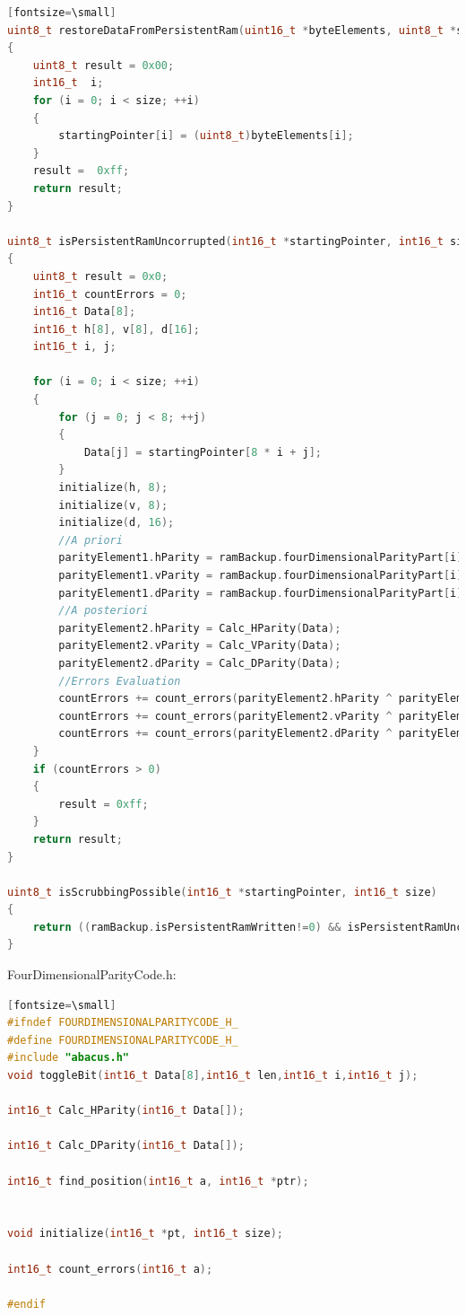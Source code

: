 \documentclass[LaM,binding=0.6cm]{../sapthesis}
\begin{document}
\begin{lstlisting}[language=c][fontsize=\small]
uint8_t restoreDataFromPersistentRam(uint16_t *byteElements, uint8_t *startingPointer, uint32_t size)
{
    uint8_t result = 0x00;
    int16_t  i;
    for (i = 0; i < size; ++i)
    {
        startingPointer[i] = (uint8_t)byteElements[i];
    }
    result =  0xff;
    return result;
}

uint8_t isPersistentRamUncorrupted(int16_t *startingPointer, int16_t size)
{
    uint8_t result = 0x0;
    int16_t countErrors = 0;
    int16_t Data[8];
    int16_t h[8], v[8], d[16];
    int16_t i, j;

    for (i = 0; i < size; ++i)
    {
        for (j = 0; j < 8; ++j)
        {
            Data[j] = startingPointer[8 * i + j];
        }
        initialize(h, 8);
        initialize(v, 8);
        initialize(d, 16);
        //A priori
        parityElement1.hParity = ramBackup.fourDimensionalParityPart[i].hParity;
        parityElement1.vParity = ramBackup.fourDimensionalParityPart[i].vParity;
        parityElement1.dParity = ramBackup.fourDimensionalParityPart[i].dParity;
        //A posteriori
        parityElement2.hParity = Calc_HParity(Data);
        parityElement2.vParity = Calc_VParity(Data);
        parityElement2.dParity = Calc_DParity(Data);
        //Errors Evaluation
        countErrors += count_errors(parityElement2.hParity ^ parityElement1.hParity);
        countErrors += count_errors(parityElement2.vParity ^ parityElement1.vParity);
        countErrors += count_errors(parityElement2.dParity ^ parityElement1.dParity);
    }
    if (countErrors > 0)
    {
        result = 0xff;
    }
    return result;
}

uint8_t isScrubbingPossible(int16_t *startingPointer, int16_t size)
{
    return ((ramBackup.isPersistentRamWritten!=0) && isPersistentRamUncorrupted((int16_t *)startingPointer, size));
}
\end{lstlisting}

FourDimensionalParityCode.h:

\begin{lstlisting}[language=c][fontsize=\small]
#ifndef FOURDIMENSIONALPARITYCODE_H_
#define FOURDIMENSIONALPARITYCODE_H_
#include "abacus.h"
void toggleBit(int16_t Data[8],int16_t len,int16_t i,int16_t j);

int16_t Calc_HParity(int16_t Data[]);

int16_t Calc_DParity(int16_t Data[]);

int16_t find_position(int16_t a, int16_t *ptr);


void initialize(int16_t *pt, int16_t size);

int16_t count_errors(int16_t a);

#endif

\end{lstlisting}
\end{document}
